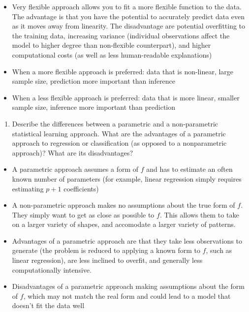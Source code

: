 \documentclass[]{book}
\providecommand{\tightlist}{%
  \setlength{\itemsep}{0pt}\setlength{\parskip}{0pt}}
\begin{document}
\begin{itemize}
\tightlist
\item
  Very flexible approach allows you to fit a more flexible function to the data. The advantage is that you have the potential to accurately predict data even as it moves away from linearity. The disadvantage are potential overfitting to the training data, increasing variance (individual observations affect the model to higher degree than non-flexible counterpart), and higher computational costs (as well as less human-readable explanations)
\item
  When a more flexible approach is preferred: data that is non-linear, large sample size, prediction more important than inference
\item
  When a less flexible approach is preferred: data that is more linear, smaller sample size, inference more important than prediction
\end{itemize}

\begin{enumerate}
\def\labelenumi{\arabic{enumi}.}
\setcounter{enumi}{5}
\tightlist
\item
  Describe the differences between a parametric and a non-parametric statistical learning approach. What are the advantages of a parametric approach to regression or classification (as opposed to a nonparametric approach)? What are its disadvantages?
\end{enumerate}

\begin{itemize}
\tightlist
\item
  A parametric approach assumes a form of \(f\) and has to estimate an often known number of parameters (for example, linear regression simply requires estimating \(p+1\) coefficients)
\item
  A non-parametric approach makes no assumptions about the true form of \(f\). They simply want to get as close as possible to \(f\). This allows them to take on a larger variety of shapes, and accomodate a larger variety of patterns.
\item
  Advantages of a parametric approach are that they take less observations to generate (the problem is reduced to applying a known form to \(f\), such as linear regression), are less inclined to overfit, and generally less computationally intensive.
\item
  Disadvantages of a parametric approach making assumptions about the form of \(f\), which may not match the real form and could lead to a model that doesn't fit the data well
\end{itemize}
\end{document}

